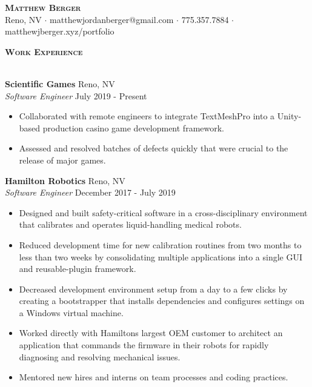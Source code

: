 \documentclass[a4paper]{article}
\newcommand{\lineunder} {
    \vspace*{-8pt} \\
    \hspace*{-18pt} \hrulefill \\
}
\newcommand{\header} [1] {
    {\hspace*{-18pt}\vspace*{6pt} \large \textbf{\textsc{#1}}}
    \vspace*{-6pt} \lineunder
    \vspace*{4pt}
}
\begin{document}
\vspace*{-40pt}

    

\begin{center}
    {\Huge \scshape \textbf{Matthew Berger}}\\
    \vspace*{4pt}
    Reno, NV $\cdot$ matthewjordanberger@gmail.com $\cdot$ 775.357.7884 $\cdot$ matthewjberger.xyz/portfolio\\
    \vspace*{-4pt}
\end{center}

\header{Work Experience}

\textbf{Scientific Games} \hfill Reno, NV\\
\textit{Software Engineer} \hfill July 2019 - Present\\
\vspace{-1mm}
\begin{itemize} \itemsep 1pt
	\item Collaborated with remote engineers to integrate TextMeshPro into a Unity-based production casino game development framework.
	\item Assessed and resolved batches of defects quickly that were crucial to the release of major games.
\end{itemize}
\textbf{Hamilton Robotics} \hfill Reno, NV\\
\textit{Software Engineer} \hfill December 2017 - July 2019\\
\vspace{-1mm}
\begin{itemize} \itemsep 1pt
	\item Designed and built safety-critical software in a cross-disciplinary environment that calibrates and operates liquid-handling medical robots.
	\item Reduced development time for new calibration routines from two months to less than two weeks by consolidating multiple applications into a single GUI and reusable-plugin framework.
	\item Decreased development environment setup from a day to a few clicks by creating a bootstrapper that installs dependencies and configures settings on a Windows virtual machine.
	\item Worked directly with Hamilton\textquotesingle{}s largest OEM customer to architect an application that commands the firmware in their robots for rapidly diagnosing and resolving mechanical issues.
	\item Mentored new hires and interns on team processes and coding practices.
\end{itemize}
\end{document}
